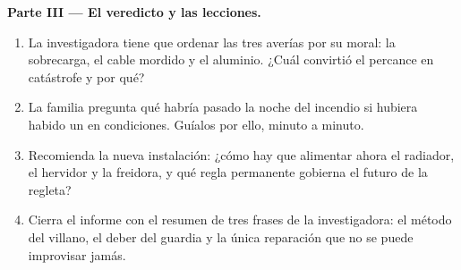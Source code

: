 \begin{problem}
\medskip\noindent\textbf{Parte III --- El veredicto y las lecciones.}
\begin{enumerate}[resume]
  \item La investigadora tiene que ordenar las tres averías por su
         moral: la sobrecarga, el cable mordido y el aluminio.
        ¿Cuál convirtió el percance en catástrofe y por qué?
  \item La familia pregunta qué habría pasado la noche del incendio
        si hubiera habido un  en condiciones. Guíalos por
        ello, minuto a minuto.
  \item Recomienda la nueva instalación: ¿cómo hay que alimentar
        ahora el radiador, el hervidor y la freidora, y qué regla
        permanente gobierna el futuro de la regleta?
  \item Cierra el informe con el resumen de tres frases de la
        investigadora: el método del villano, el deber del guardia y
        la única reparación que no se puede improvisar jamás.
\end{enumerate}
\end{problem}
